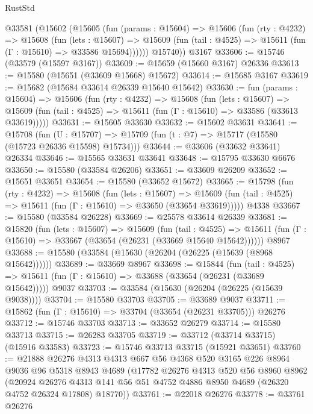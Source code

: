 \begin{lexlean}{RustStd}
\begin{coremodule}
    @33581
      (@15602
        (@15605
          (fun (params : @15604) =>
          @15606
            (fun (rty : @4232) =>
            @15608
              (fun (lets : @15607) =>
              @15609 (fun (tail : @4525) => @15611 (fun (Γ : @15610) => @33586 @15694))))))
        @15740))
    @3167
@33606 := @15746 (@33579 (@15597 @3167))
@33609 := @15659 (@15660 @3167) @26336
@33613 := @15580 (@15651 (@33609 @15668) @15672)
@33614 := @15685 @3167
@33619 := @15682 (@15684 @33614 @26339 @15640 @15642)
@33630 := fun (params : @15604) =>
  @15606
    (fun (rty : @4232) =>
    @15608
      (fun (lets : @15607) =>
      @15609 (fun (tail : @4525) => @15611 (fun (Γ : @15610) => @33586 (@33613 @33619)))))
@33631 := @15605 @33630
@33632 := @15602 @33631
@33641 := @15708
    (fun (U : @15707) => @15709 (fun (t : @7) => @15717 (@15580 (@15723 @26336 @15598) @15734)))
@33644 := @33606 (@33632 @33641) @26334
@33646 := @15565 @33631 @33641
@33648 := @15795 @33630 @6676
@33650 := @15580 (@33584 @26206)
@33651 := @33609 @26209
@33652 := @15651 @33651
@33654 := @15580 (@33652 @15672)
@33665 := @15798
    (fun (rty : @4232) =>
    @15608
      (fun (lets : @15607) =>
      @15609 (fun (tail : @4525) => @15611 (fun (Γ : @15610) => @33650 (@33654 @33619)))))
    @4338
@33667 := @15580 (@33584 @26228)
@33669 := @25578 @33614 @26339
@33681 := @15820
    (fun (lets : @15607) =>
    @15609
      (fun (tail : @4525) =>
      @15611 (fun (Γ : @15610) => @33667 (@33654 (@26231 (@33669 @15640 @15642))))))
    @8967
@33688 := @15580 (@33584 (@15630 (@26204 (@26225 (@15639 (@8968 @15642))))))
@33689 := @33669 @8967
@33698 := @15844
    (fun (tail : @4525) => @15611 (fun (Γ : @15610) => @33688 (@33654 (@26231 (@33689 @15642)))))
    @9037
@33703 := @33584 (@15630 (@26204 (@26225 (@15639 @9038))))
@33704 := @15580 @33703
@33705 := @33689 @9037
@33711 := @15862 (fun (Γ : @15610) => @33704 (@33654 (@26231 @33705))) @26276
@33712 := @15746 @33703
@33713 := @33652 @26279
@33714 := @15580 @33713
@33715 := @26283 @33705
@33719 := @33712 (@33714 @33715) (@15916 @33583)
@33723 := @15746 @33713 @33715 (@15921 @33651)
@33760 := @21888
    @26276
    @4313
    @4313
    @667
    @56
    @4368
    @520
    @3165
    @226
    @8964
    @9036
    @96
    @5318
    @8943
    @4689
    (@17782
      @26276
      @4313
      @520
      @56
      @8960
      @8962
      (@20924
        @26276
        @4313
        @141
        @56
        @51
        @4752
        @4886
        @8950
        @4689
        (@26320 @4752 @26324 @17808)
        @18770))
@33761 := @22018 @26276
@33778 := @33761
    @26276

\end{coremodule}
\end{lexlean}
